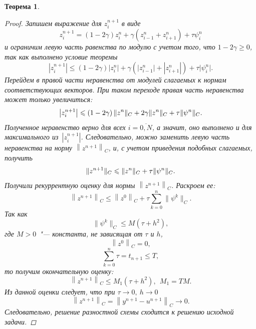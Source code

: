 \documentclass[11pt,a4paper,twoside,listtotoc,bibtotoc]{report}
\numberwithin{equation}{section}
\theoremstyle{definition}
\theoremstyle{plain}
\newtheorem*{theorem*}{Теорема}
\DeclarePairedDelimiter\norm{\lVert}{\rVert}
\begin{document}
\begin{theorem*}
\begin{proof}
        Запишем выражение для $z_i^{n+1}$ в виде
        $$
            z_i^{n+1} = \left(1 - 2\gamma\right)z_i^n +
            \gamma\left(z_{i-1}^n + z_{i+1}^n\right) +
            \tau \psi_i^n
        $$
        и ограничим левую часть равенства по модулю с учетом того, что $1 - 2\gamma \geqslant 0$,
        так как выполнено условие теоремы
        $$
            \left|z_i^{n+1}\right|\leqslant\left(1-2\gamma\right)
            \big|z_i^n\big| + \gamma\left(\big|z_{i-1}^n\big| +
            \left|z_{i+1}^n\right|\right) + \tau \big|\psi_i^n\big|.
        $$
        Перейдем в правой части неравенства от модулей слагаемых к нормам
        соответствующих векторов. При таком переходе правая часть неравенства может
        только увеличиться:
        $$
            \left|z_i^{n+1}\right| \leqslant\left(1 - 2\gamma\right)
            \norm{z^n}_C + 2\gamma\norm{z^n}_C +
            \tau \norm{\psi^n}_C.
        $$
        Полученное неравенство верно для всех $i = \overline{0,N}$, а значит,
        оно выполнено и для максимального из~$\left|z_i^{n+1}\right|$.
        Следовательно,
        можно заменить левую часть неравенства на норму $\left\|z^{n+1}\right\|_C$, и,
        с учетом приведения подобных слагаемых, получить
        $$
            \norm{z^{n+1}}_C \leqslant \norm{z^n}_C+\tau\norm{\psi^n}_C.
        $$
        Получили рекуррентную оценку для нормы $\left\|z^{n+1}\right\|_C$.
        Раскроем ее:
        \begin{equation}
            \label{rek_score}
             \left\|z^{n+1}\right\|_C \leqslant \left\|z^0\right\|_C +
             \tau \sum_{k = 0}^n\big\|\psi^k\big\|_C.
        \end{equation}
        Так как
        $$
            \big\|\psi^k\big\|_C \leqslant M\left(\tau + h^2\right),
        $$
        где $M > 0$~"--- константа, не зависящая от $\tau$ и $h$,
        $$
            \left\|z^0\right\|_C = 0,
        $$
        $$
            \sum_{k = 0}^n\tau = t_{n+1} \leqslant T,
        $$
        то получим окончательную оценку:
        $$
            \left\|z^{n+1}\right\|_C \leqslant M_1\left(\tau + h^2\right),~~M_1=TM.
        $$
        Из данной оценки следует, что при $\tau \rightarrow 0,~h \rightarrow 0$
        $$
            \left\|z^{n+1}\right\|_C = \left\|y^{n+1}-u^{n+1}\right\|_C\rightarrow0.
        $$
        Следовательно, решение разностной схемы сходится к решению исходной задачи.


\end{proof}
\end{theorem*}
\end{document}
